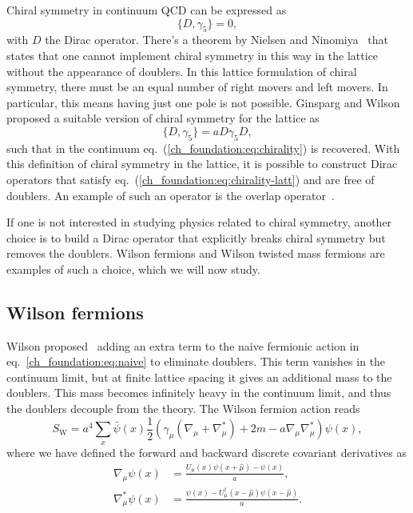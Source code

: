 Chiral symmetry in continuum QCD can be expressed as 
\begin{equation}
\label{ch_foundation:eq:chirality}
\{D,\gamma_5\}=0,
\end{equation}
with $D$ the Dirac operator. There's a theorem by Nielsen and Ninomiya~\cite{} that states that one cannot implement chiral symmetry in this way in the lattice without the appearance of doublers.
In this lattice formulation of chiral symmetry, there must be an equal number of right movers and left movers. In particular, this means having just one pole is not possible. Ginsparg and Wilson~\cite{} proposed a suitable version of chiral symmetry for the lattice as
\begin{equation}
\label{ch_foundation:eq:chirality-latt}
\{D,\gamma_5\}=aD\gamma_5D,
\end{equation}
such that in the continuum eq.~(\ref{ch_foundation:eq:chirality}) is recovered. With this definition of chiral symmetry in the lattice, it is possible to construct Dirac operators that satisfy eq.~(\ref{ch_foundation:eq:chirality-latt}) and are free of doublers. An example of such an operator is the overlap operator~\cite{}.

If one is not interested in studying physics related to chiral symmetry, another choice is to build a Dirac operator that explicitly breaks chiral symmetry but removes the doublers. Wilson fermions and Wilson twisted mass fermions are examples of such a choice, which we will now study.


\subsection{Wilson fermions}
\label{ch_foundation:subsec:Wilson}

Wilson proposed~\cite{Wilson:1974sk} adding an extra term to the naive fermionic action in eq.~\eqref{ch_foundation:eq:naive} to eliminate doublers. This term vanishes in the continuum limit, but at finite lattice spacing it gives an additional mass to the doublers. This mass becomes infinitely heavy in the continuum limit, and thus the doublers decouple from the theory. The Wilson fermion action reads
\begin{equation}
\label{ch_foundation:eq:Wil_fer}
S_{\textrm{W}}=a^4\sum_x\bar{\psi}(x)\frac{1}{2}\left(\gamma_{\mu}\left(\nabla_{\mu}+\nabla_{\mu}^*\right)+2m-a\nabla_{\mu}\nabla_{\mu}^*\right)\psi(x),
\end{equation}
where we have defined the forward and backward discrete covariant derivatives as
\begin{align}
\nabla_{\mu}\psi(x)&=\frac{U_{\mu}(x)\psi(x+\hat{\mu})-\psi(x)}{a},\\
\nabla_{\mu}^*\psi(x)&=\frac{\psi(x)-U_{\mu}^{\dagger}(x-\hat{\mu})\psi(x-\hat{\mu})}{a}.
\end{align}

